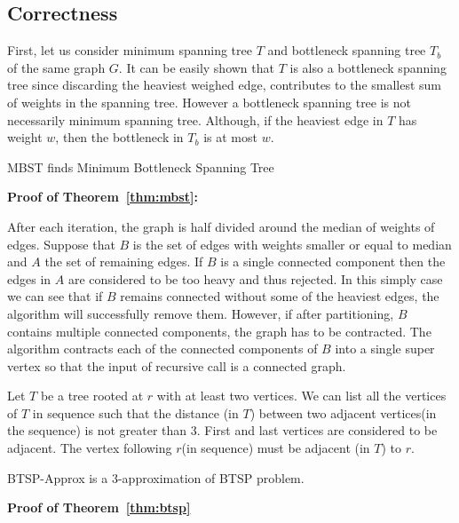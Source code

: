 \documentclass[runningheads, a4paper]{llncs}
\begin{document}
\subsection{Correctness}

First, let us consider minimum spanning tree $T$ and bottleneck spanning tree $T_{b}$ of the same graph $G$. It can be easily shown that $T$ is also a bottleneck spanning tree since discarding the heaviest weighed edge, contributes to the smallest sum of weights in the spanning tree. However a bottleneck spanning tree is not necessarily minimum spanning tree. Although, if the heaviest edge in $T$ has weight $w$, then the bottleneck in $T_{b}$ is at most $w$.

\begin{theorem} \label{thm:mbst}
    MBST finds Minimum Bottleneck Spanning Tree
\end{theorem}

\textbf {Proof of Theorem~\ref{thm:mbst}:}

After each iteration, the graph is half divided around the median of weights of edges. Suppose that $B$ is the set of edges with weights smaller or equal to median and $A$ the set of remaining edges. If $B$ is a single connected component then the edges in $A$ are considered to be too heavy and thus rejected. In this simply case we can see that if $B$ remains connected without some of the heaviest edges, the algorithm will successfully remove them. However, if after partitioning, $B$ contains multiple connected components, the graph has to be contracted. The algorithm contracts each of the connected components of $B$ into a single super vertex so that the input of recursive call is a connected graph.

\begin{theorem} \label{thm:tree_seq}
    Let $T$ be a tree rooted at $r$ with at least two vertices. We can list all the vertices of $T$ in sequence such that the distance (in $T$) between two adjacent vertices(in the sequence) is not greater than 3. First and last vertices are considered to be adjacent. The vertex following $r$(in sequence) must be adjacent (in $T$) to $r$.
\end{theorem}

\begin{theorem} \label{thm:btsp}
    BTSP-Approx is a 3-approximation of BTSP problem.
\end{theorem}

\textbf {Proof of Theorem~\ref{thm:btsp}}\\
        
\end{document}
